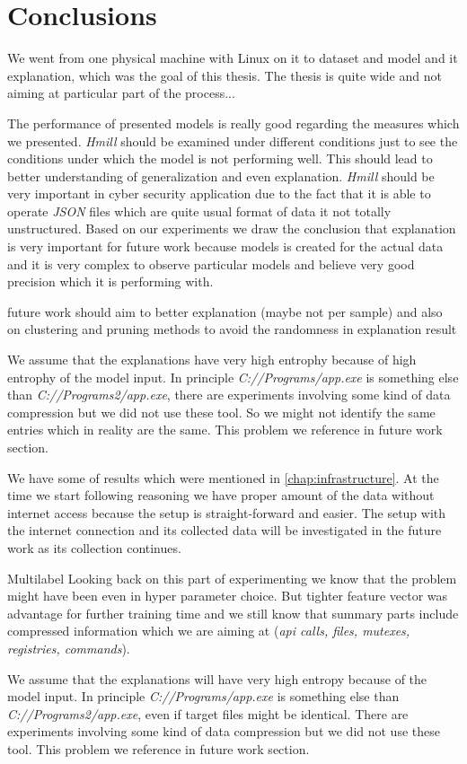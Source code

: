 \chapter{Conclusions} \label{chap:concl}
 We went from one physical machine with Linux on it to dataset and model and it explanation, which was the goal of this thesis. The thesis is quite wide and not aiming at particular part of the process...



The performance of presented models is really good regarding the measures which we presented. \emph{Hmill} should be examined under different conditions just to see the conditions under which the model is not performing well. This should lead to better understanding of generalization and even explanation. \emph{Hmill} should be very important in cyber security application due to the fact that it is able to operate \emph{JSON} files which are quite usual format of data it not totally unstructured. Based on our experiments we draw the conclusion that explanation is very important for future work because models is created for the actual data and it is very complex to observe particular models and believe very good precision which it is performing with.

future work should aim to better explanation (maybe not per sample) and also on clustering and pruning methods to avoid the randomness in explanation result


We assume that the explanations have very high entrophy because of high entrophy of the model input. In principle \emph{C://Programs/app.exe} is something else than \emph{C://Programs2/app.exe}, there are experiments involving some kind of data compression but we did not use these tool. So we might not identify the same entries which in reality are the same. This problem we reference in future work section.

We have some of results which were mentioned in \ref{chap:infrastructure}. At the time we start following reasoning we have proper amount of the data without internet access because the setup is straight-forward and easier. The setup with the internet connection and its collected data will be investigated in the future work as its collection continues. 


Multilabel
Looking back on this part of experimenting we know that the problem might have been even in hyper parameter choice. But tighter feature vector was advantage for further training time and we still know that summary parts include compressed information which we are aiming at (\emph{api calls, files, mutexes, registries, commands}).

We assume that the explanations will have very high entropy because of the model input. In principle \emph{C://Programs/app.exe} is something else than \emph{C://Programs2/app.exe}, even if target files might be identical. There are experiments involving some kind of data compression but we did not use these tool. This problem we reference in future work section.